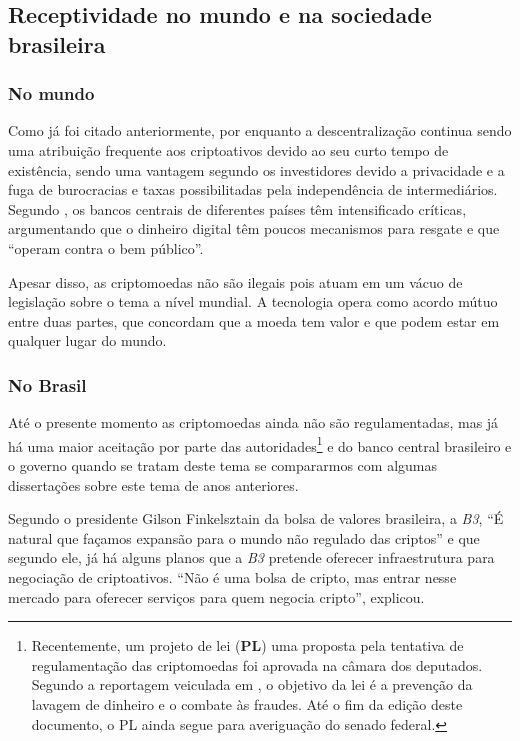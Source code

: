 \subsection{Receptividade no mundo e na sociedade brasileira}

\subsubsection{No mundo}
Como já foi citado anteriormente, por enquanto a descentralização continua sendo uma atribuição  frequente aos criptoativos devido ao seu curto tempo de existência, sendo uma vantagem segundo os investidores devido a privacidade e a fuga de burocracias e taxas possibilitadas pela independência de intermediários. Segundo \cite{NP}, os bancos centrais de diferentes países têm intensificado críticas, argumentando que o dinheiro digital têm poucos mecanismos para resgate e que “operam contra o bem público”. 

\begin{citacao}
	Apesar disso, as criptomoedas não são ilegais pois atuam em um vácuo de legislação sobre o tema a nível mundial. A tecnologia opera como acordo mútuo entre duas partes, que concordam que a moeda tem valor e que podem estar em qualquer lugar do mundo. \cite{NP}
	\end{citacao}   

\subsubsection{No Brasil} 
Até o presente momento as criptomoedas ainda não são regulamentadas, mas já há uma maior aceitação por parte das autoridades\footnote{Recentemente, um projeto de lei (\textbf{PL}) uma proposta pela tentativa de regulamentação das criptomoedas foi aprovada na câmara dos deputados. Segundo a reportagem veiculada em \cite{JORNALBR}, o objetivo da lei é a prevenção da lavagem de dinheiro e o combate às fraudes. Até o fim da edição deste documento, o PL ainda segue para averiguação do senado federal. } e do banco central brasileiro e o governo quando se tratam deste tema se compararmos com algumas dissertações sobre este tema de anos anteriores. 

Segundo o presidente Gilson Finkelsztain da bolsa de valores brasileira, a \textit{B3}, ``É natural que façamos expansão para o mundo não regulado das criptos'' e que segundo ele, já há alguns planos que a \textit{B3} pretende oferecer infraestrutura para negociação de criptoativos. ``Não é uma bolsa de cripto, mas entrar nesse mercado para oferecer serviços para quem negocia cripto'', explicou. \cite{B3} 

